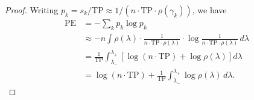 \documentclass[10pt,a4paper]{amsart}
\begin{document}
\begin{proof}
Writing $p_k = s_k / \mathrm{TP} \approx 1/(n \cdot \mathrm{TP} \cdot \rho(\gamma_k))$, we have
\begin{align}
\mathrm{PE} &= -\sum_k p_k \log p_k \nonumber \\
&\approx -n \int \rho(\lambda) \cdot \frac{1}{n \cdot \mathrm{TP} \cdot \rho(\lambda)} \cdot \log \frac{1}{n \cdot \mathrm{TP} \cdot \rho(\lambda)}\, d\lambda \nonumber \\
&= \frac{1}{\mathrm{TP}} \int_{\lambda_-}^{\lambda_+} \left[\log(n \cdot \mathrm{TP}) + \log \rho(\lambda)\right] d\lambda \nonumber \\
&= \log(n \cdot \mathrm{TP}) + \frac{1}{\mathrm{TP}} \int_{\lambda_-}^{\lambda_+} \log \rho(\lambda)\, d\lambda.
\end{align}
\end{proof}
\end{document}
